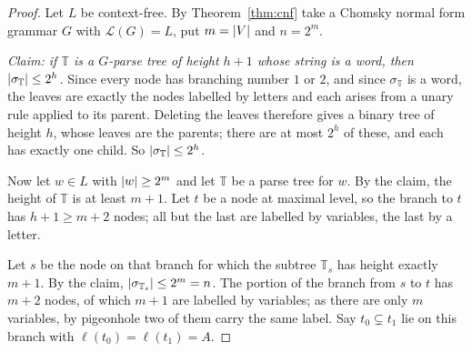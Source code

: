 \documentclass[a4paper]{scrartcl}
\newcommand{\lang}{\mathcal{L}}
\begin{document}
\begin{proof}
	Let $L$ be context-free. By Theorem~\ref{thm:cnf} take a Chomsky normal form grammar $G$ with $\lang(G) = L$, put $m = \lvert V\rvert$ and $n = 2^m$.

	\emph{Claim: if $\mathbb T$ is a $G$-parse tree of height $h+1$ whose string is a word, then $\lvert\sigma_{\mathbb T}\rvert \leq 2^h$.} Since every node has branching number $1$ or $2$, and since $\sigma_{\mathbb T}$ is a word, the leaves are exactly the nodes labelled by letters and each arises from a unary rule applied to its parent. Deleting the leaves therefore gives a binary tree of height $h$, whose leaves are the parents; there are at most $2^h$ of these, and each has exactly one child. So $\lvert\sigma_{\mathbb T}\rvert \leq 2^h$.

	Now let $w \in L$ with $\lvert w\rvert \geq 2^m$ and let $\mathbb T$ be a parse tree for $w$. By the claim, the height of $\mathbb T$ is at least $m+1$. Let $t$ be a node at maximal level, so the branch to $t$ has $h+1 \geq m+2$ nodes; all but the last are labelled by variables, the last by a letter.

	Let $s$ be the node on that branch for which the subtree $\mathbb T_s$ has height exactly $m+1$. By the claim, $\lvert\sigma_{\mathbb T_s}\rvert \leq 2^m = n$. The portion of the branch from $s$ to $t$ has $m+2$ nodes, of which $m+1$ are labelled by variables; as there are only $m$ variables, by pigeonhole two of them carry the same label. Say $t_0 \subsetneq t_1$ lie on this branch with $\ell(t_0) = \ell(t_1) = A$.


\end{proof}
\end{document}
